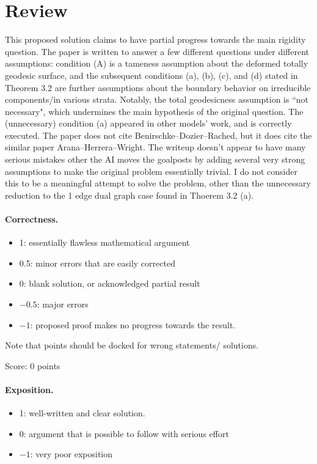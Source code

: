 \documentclass[11pt]{article}
\theoremstyle{definition}
\theoremstyle{remark}
\begin{document}
\maketitle

\section{Review}
This proposed solution claims to have partial progress towards the main rigidity question. The paper is written to answer a few different questions under different assumptions: condition (A) is a tameness assumption about the deformed totally geodesic surface, and the subsequent conditions (a), (b), (c), and (d) stated in Theorem 3.2 are further assumptions about the boundary behavior on irreducible components/in various strata. Notably, the total geodesicness assumption is ``not necessary", which undermines the main hypothesis of the original question. The (unnecessary) condition (a)  appeared in other models' work, and is correctly executed. The paper does not cite Benirschke--Dozier--Rached, but it does cite the similar paper Arana--Herrera--Wright. The writeup doesn't appear to have many serious mistakes other the AI moves the goalposts by adding several very strong assumptions to make the original problem essentially trivial. I do not consider this to be a meaningful attempt to solve the problem, other than the unnecessary reduction to the 1 edge dual graph case found in Thoerem 3.2 (a).

\paragraph{Correctness.}
\begin{itemize}
	\item  1: essentially flawless mathematical argument
	\item  0.5: minor errors that are easily corrected
	\item  0: blank solution, or acknowledged partial result
	\item  $-0.5$: major errors
	\item  $-1$: proposed proof makes no progress towards the result.
\end{itemize}
Note that points should be docked for wrong statements/ solutions.

\noindent Score: 0 points

\paragraph{Exposition.}
\begin{itemize}
	\item  1: well-written and clear solution.
	\item  0: argument that is possible to follow with serious effort
	\item  $-1$: very poor exposition
\end{itemize}
\end{document}
